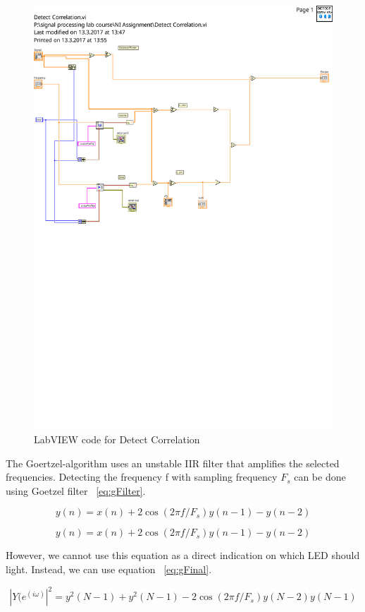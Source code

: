 \begin{figure}[H]
  \centering
  \includegraphics[width=0.8\linewidth]{detect_freq}
  \caption{LabVIEW code for Detect Correlation}
\label{fig:correlation}
\end{figure}


The Goertzel-algorithm uses an unstable IIR filter that amplifies the selected frequencies. Detecting the frequency f with sampling frequency $F_{s}$ can be done using Goetzel filter ~\ref{eq:gFilter}.

\begin{equation}
  \label{eq:gFilter}
  y(n) =x(n) + 2\cos(2 \pi f/F_{s})y(n-1) - y(n-2)
\end{equation}

\begin{equation}
  \label{eq:gFilter}
  y(n) =x(n) + 2\cos(2 \pi f/F_{s})y(n-1) - y(n-2)
\end{equation}

However, we cannot use this equation as a direct indication on which LED should light. Instead, we can use equation ~\ref{eq:gFinal}.

\begin{equation}
  \label{eq:gFinal}
  |Y(e^{(i \omega)}|^2 = y^2(N-1) + y^2(N-1) - 2 \cos(2 \pi f/F_{s})y(N-2)y(N-1)
\end{equation}

